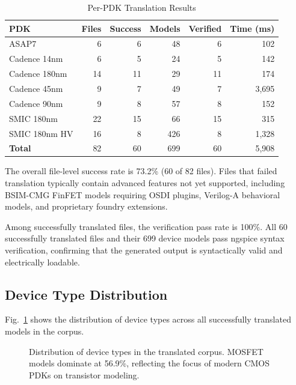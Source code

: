 \documentclass[conference]{IEEEtran}
\begin{document}
\begin{table}[htbp]
\caption{Per-PDK Translation Results}
\label{tab:translation_results}
\centering
\begin{tabular}{lrrrrr}
\toprule
\textbf{PDK} & \textbf{Files} & \textbf{Success} & \textbf{Models} & \textbf{Verified} & \textbf{Time (ms)} \\
\midrule
ASAP7 & 6 & 6 & 48 & 6 & 102 \\
Cadence 14nm & 6 & 5 & 24 & 5 & 142 \\
Cadence 180nm & 14 & 11 & 29 & 11 & 174 \\
Cadence 45nm & 9 & 7 & 49 & 7 & 3,695 \\
Cadence 90nm & 9 & 8 & 57 & 8 & 152 \\
SMIC 180nm & 22 & 15 & 66 & 15 & 315 \\
SMIC 180nm HV & 16 & 8 & 426 & 8 & 1,328 \\
\midrule
\textbf{Total} & 82 & 60 & 699 & 60 & 5,908 \\
\bottomrule
\end{tabular}
\end{table}

The overall file-level success rate is 73.2\% (60 of 82 files). Files that failed translation typically contain advanced features not yet supported, including BSIM-CMG FinFET models requiring OSDI plugins, Verilog-A behavioral models, and proprietary foundry extensions.

Among successfully translated files, the verification pass rate is 100\%. All 60 successfully translated files and their 699 device models pass ngspice syntax verification, confirming that the generated output is syntactically valid and electrically loadable.

\subsection{Device Type Distribution}

Fig.~\ref{fig:device_dist} shows the distribution of device types across all successfully translated models in the corpus.

\begin{figure}[htbp]
\centering
{}
\caption{Distribution of device types in the translated corpus. MOSFET models dominate at 56.9\%, reflecting the focus of modern CMOS PDKs on transistor modeling.}
\label{fig:device_dist}
\end{figure}
\end{document}
